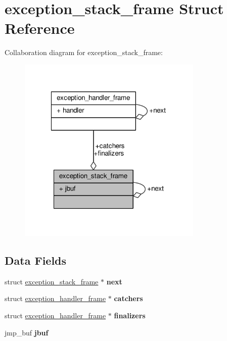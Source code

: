 \hypertarget{structexception__stack__frame}{\section{exception\-\_\-stack\-\_\-frame Struct Reference}
\label{structexception__stack__frame}
}


Collaboration diagram for exception\-\_\-stack\-\_\-frame\-:
\nopagebreak
\begin{figure}[H]
\begin{center}
\leavevmode
\includegraphics[width=250pt]{structexception__stack__frame__coll__graph}
\end{center}
\end{figure}
\subsection*{Data Fields}
\begin{DoxyCompactItemize}
\item 
\hypertarget{structexception__stack__frame_abb538d9a6f6155ed83f140dd2adb7457}{struct \hyperlink{structexception__stack__frame}{exception\-\_\-stack\-\_\-frame} $\ast$ {\bfseries next}}\label{structexception__stack__frame_abb538d9a6f6155ed83f140dd2adb7457}

\item 
\hypertarget{structexception__stack__frame_a950ab78cc930f9662ff9cb7eedcfda79}{struct \hyperlink{structexception__handler__frame}{exception\-\_\-handler\-\_\-frame} $\ast$ {\bfseries catchers}}\label{structexception__stack__frame_a950ab78cc930f9662ff9cb7eedcfda79}

\item 
\hypertarget{structexception__stack__frame_a543e62e78b4b2777e9df32ccc5feba38}{struct \hyperlink{structexception__handler__frame}{exception\-\_\-handler\-\_\-frame} $\ast$ {\bfseries finalizers}}\label{structexception__stack__frame_a543e62e78b4b2777e9df32ccc5feba38}

\item 
\hypertarget{structexception__stack__frame_a6f81386a697bcae78000625ee8ba02fa}{jmp\-\_\-buf {\bfseries jbuf}}\label{structexception__stack__frame_a6f81386a697bcae78000625ee8ba02fa}

\end{DoxyCompactItemize}


